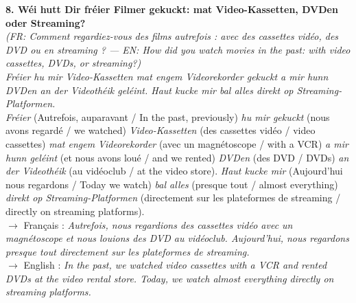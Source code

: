\noindent\textbf{8. Wéi hutt Dir fréier Filmer gekuckt: mat Video-Kassetten, DVDen oder Streaming?}\\
\textit{(FR: Comment regardiez-vous des films autrefois : avec des cassettes vidéo, des DVD ou en streaming ? — EN: How did you watch movies in the past: with video cassettes, DVDs, or streaming?)}\\[0.3em]
\textit{Fréier hu mir Video-Kassetten mat engem Videorekorder gekuckt a mir hunn DVDen an der Videothéik geléint. Haut kucke mir bal alles direkt op Streaming-Platformen.}\\
\textit{Fréier} (Autrefois, auparavant / In the past, previously) \textit{hu mir gekuckt} (nous avons regardé / we watched) \textit{Video-Kassetten} (des cassettes vidéo / video cassettes) \textit{mat engem Videorekorder} (avec un magnétoscope / with a VCR) \textit{a mir hunn geléint} (et nous avons loué / and we rented) \textit{DVDen} (des DVD / DVDs) \textit{an der Videothéik} (au vidéoclub / at the video store). \textit{Haut kucke mir} (Aujourd'hui nous regardons / Today we watch) \textit{bal alles} (presque tout / almost everything) \textit{direkt op Streaming-Platformen} (directement sur les plateformes de streaming / directly on streaming platforms).\\
$\rightarrow$ Français : \textit{Autrefois, nous regardions des cassettes vidéo avec un magnétoscope et nous louions des DVD au vidéoclub. Aujourd'hui, nous regardons presque tout directement sur les plateformes de streaming.}\\
$\rightarrow$ English : \textit{In the past, we watched video cassettes with a VCR and rented DVDs at the video rental store. Today, we watch almost everything directly on streaming platforms.}\\[0.8em]


